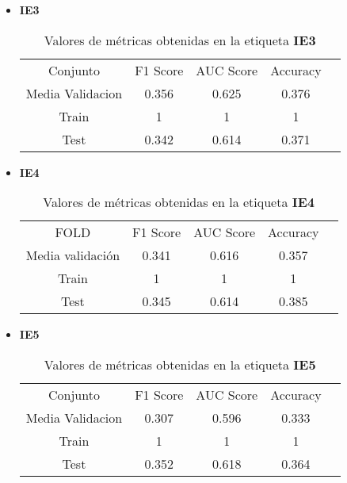 \begin{itemize}
	\item  \textbf{IE3}
	      \begin{table}[H]
		      \centering
		      \begin{tabular}{|c|c|c|c|c}
			      \cline{1-4}
			      Conjunto         & F1 Score & AUC Score & Accuracy \\ \cline{1-4}
			      Media Validacion & 0.356    & 0.625     & 0.376    \\ \cline{1-4}
			      Train            & 1        & 1         & 1        \\ \cline{1-4}
			      Test             & 0.342    & 0.614     & 0.371    \\ \cline{1-4}
		      \end{tabular}
		      \caption{Valores de métricas obtenidas en la etiqueta \textbf{IE3}}
	      \end{table}
	\item  \textbf{IE4}
	      \begin{table}[H]
		      \centering
		      \begin{tabular}{|c|c|c|c|c}
			      \cline{1-4}
			      FOLD             & F1 Score & AUC Score & Accuracy \\ \cline{1-4}
			      Media validación & 0.341    & 0.616     & 0.357    \\ \cline{1-4}
			      Train            & 1        & 1         & 1        \\ \cline{1-4}
			      Test             & 0.345    & 0.614     & 0.385    \\ \cline{1-4}
		      \end{tabular}
		      \caption{Valores de métricas obtenidas en la etiqueta \textbf{IE4}}
	      \end{table}
	\item  \textbf{IE5}
	      \begin{table}[H]
		      \centering
		      \begin{tabular}{|c|c|c|c|c}
			      \cline{1-4}
			      Conjunto         & F1 Score & AUC Score & Accuracy \\ \cline{1-4}
			      Media Validacion & 0.307    & 0.596     & 0.333    \\ \cline{1-4}
			      Train            & 1        & 1         & 1        \\ \cline{1-4}
			      Test             & 0.352    & 0.618    & 0.364    \\ \cline{1-4}
		      \end{tabular}
		      \caption{Valores de métricas obtenidas en la etiqueta \textbf{IE5}}

\end{table}
\end{itemize}
